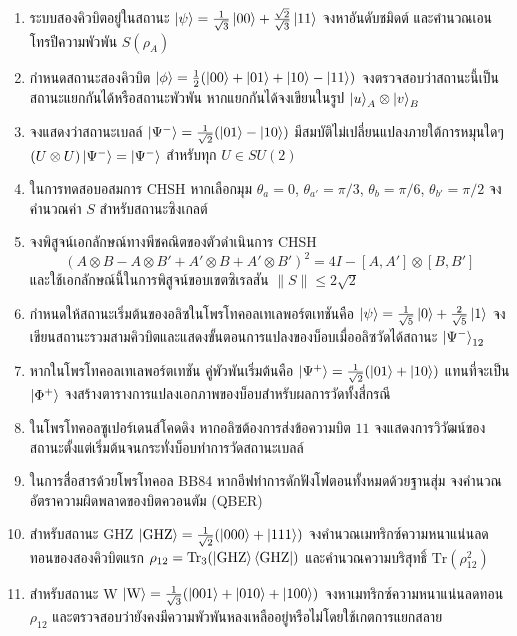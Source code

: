 \begin{enumerate}[label=\textbf{\arabic*.}]
    \item ระบบสองคิวบิตอยู่ในสถานะ $\ket{\psi} = \frac{1}{\sqrt{3}}\ket{00} + \frac{\sqrt{2}}{\sqrt{3}}\ket{11}$ จงหาอันดับชมิดต์ และคำนวณเอนโทรปีความพัวพัน $S(\rho_A)$
    \item กำหนดสถานะสองคิวบิต $\ket{\phi} = \frac{1}{2}(\ket{00} + \ket{01} + \ket{10} - \ket{11})$ จงตรวจสอบว่าสถานะนี้เป็นสถานะแยกกันได้หรือสถานะพัวพัน หากแยกกันได้จงเขียนในรูป $\ket{u}_A \otimes \ket{v}_B$
    \item จงแสดงว่าสถานะเบลล์ $\ket{\Psi^-} = \frac{1}{\sqrt{2}}(\ket{01}-\ket{10})$ มีสมบัติไม่เปลี่ยนแปลงภายใต้การหมุนใดๆ $(U \otimes U)\ket{\Psi^-} = \ket{\Psi^-}$ สำหรับทุก $U \in SU(2)$
    \item ในการทดสอบอสมการ CHSH หากเลือกมุม $\theta_a = 0$, $\theta_{a'} = \pi/3$, $\theta_b = \pi/6$, $\theta_{b'} = \pi/2$ จงคำนวณค่า $S$ สำหรับสถานะซิงเกลต์
    \item จงพิสูจน์เอกลักษณ์ทางพีชคณิตของตัวดำเนินการ CHSH
    \begin{equation}
    (A \otimes B - A \otimes B' + A' \otimes B + A' \otimes B')^2 = 4I - [A, A'] \otimes [B, B']
    \end{equation}
    และใช้เอกลักษณ์นี้ในการพิสูจน์ขอบเขตซิเรลสัน $\|S\| \le 2\sqrt{2}$
    \item กำหนดให้สถานะเริ่มต้นของอลิซในโพรโทคอลเทเลพอร์ตเทชันคือ $\ket{\psi} = \frac{1}{\sqrt{5}}\ket{0} + \frac{2}{\sqrt{5}}\ket{1}$ จงเขียนสถานะรวมสามคิวบิตและแสดงขั้นตอนการแปลงของบ็อบเมื่ออลิซวัดได้สถานะ $\ket{\Psi^-}_{12}$
    \item หากในโพรโทคอลเทเลพอร์ตเทชัน คู่พัวพันเริ่มต้นคือ $\ket{\Psi^+} = \frac{1}{\sqrt{2}}(\ket{01}+\ket{10})$ แทนที่จะเป็น $\ket{\Phi^+}$ จงสร้างตารางการแปลงเอกภาพของบ็อบสำหรับผลการวัดทั้งสี่กรณี
    \item ในโพรโทคอลซูเปอร์เดนส์โคดดิง หากอลิซต้องการส่งข้อความบิต $11$ จงแสดงการวิวัฒน์ของสถานะตั้งแต่เริ่มต้นจนกระทั่งบ็อบทำการวัดสถานะเบลล์
    \item ในการสื่อสารด้วยโพรโทคอล BB84 หากอีฟทำการดักฟังโฟตอนทั้งหมดด้วยฐานสุ่ม จงคำนวณอัตราความผิดพลาดของบิตควอนตัม (QBER)
    \item สำหรับสถานะ GHZ $\ket{\text{GHZ}} = \frac{1}{\sqrt{2}}(\ket{000}+\ket{111})$ จงคำนวณเมทริกซ์ความหนาแน่นลดทอนของสองคิวบิตแรก $\rho_{12} = \text{Tr}_3(\ket{\text{GHZ}}\bra{\text{GHZ}})$ และคำนวณความบริสุทธิ์ $\text{Tr}(\rho_{12}^2)$
    \item สำหรับสถานะ W $\ket{\text{W}} = \frac{1}{\sqrt{3}}(\ket{001}+\ket{010}+\ket{100})$ จงหาเมทริกซ์ความหนาแน่นลดทอน $\rho_{12}$ และตรวจสอบว่ายังคงมีความพัวพันหลงเหลืออยู่หรือไม่โดยใช้เกตการแยกสลาย

\end{enumerate}
